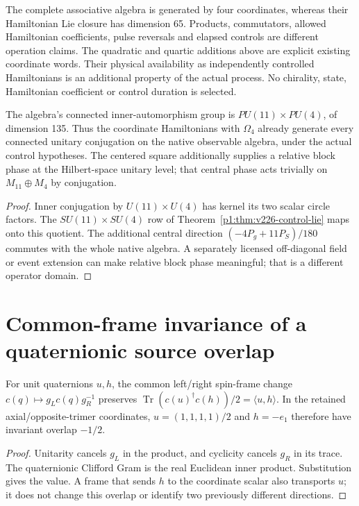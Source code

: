 \documentclass[11pt]{article}
\begin{document}
\begin{remark}
The complete associative algebra is generated by four coordinates, whereas
their Hamiltonian Lie closure has dimension 65. Products, commutators,
allowed Hamiltonian coefficients, pulse reversals and elapsed controls are
different operation claims. The quadratic and quartic additions above are
explicit existing coordinate words. Their physical availability as independently
controlled Hamiltonians is an additional property of the actual process.
No chirality, state, Hamiltonian coefficient or control duration is selected.
\end{remark}

\begin{corollary}
\label{p1:cor:v226-native-inner-controls}
The algebra's connected inner-automorphism group is
$PU(11)\times PU(4)$, of dimension 135. Thus the coordinate Hamiltonians
with $\Omega_4$ already generate every connected unitary conjugation on the
native observable algebra, under the actual control hypotheses.
The centered square additionally supplies a relative block phase at the
Hilbert-space unitary level; that central phase acts trivially on
$M_{11}\oplus M_4$ by conjugation.
\end{corollary}
\begin{proof}
Inner conjugation by $U(11)\times U(4)$ has kernel its two scalar circle
factors. The $SU(11)\times SU(4)$ row of
Theorem~\ref{p1:thm:v226-control-lie} maps onto this quotient.
The additional central direction $(-4P_g+11P_S)/180$ commutes with the
whole native algebra. A separately licensed off-diagonal field or event
extension can make relative block phase meaningful; that is a different
operator domain.
\end{proof}


\section{Common-frame invariance of a quaternionic source overlap}
\label{p1:sec:v229-source-overlap}
\begin{corollary}
\label{p1:cor:v229-common-frame-overlap}
For unit quaternions $u,h$, the common left/right spin-frame change
$c(q)\mapsto g_Lc(q)g_R^{-1}$ preserves
$\operatorname{Tr}(c(u)^\dagger c(h))/2=\langle u,h\rangle$.
In the retained axial/opposite-trimer coordinates, $u=(1,1,1,1)/2$
and $h=-e_1$ therefore have invariant overlap $-1/2$.
\end{corollary}
\begin{proof}
Unitarity cancels $g_L$ in the product, and cyclicity cancels $g_R$
in its trace. The quaternionic Clifford Gram is the real Euclidean
inner product. Substitution gives the value. A frame that sends $h$
to the coordinate scalar also transports $u$; it does not change this
overlap or identify two previously different directions.
\end{proof}
\end{document}
